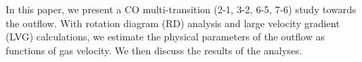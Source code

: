 In this paper, we present a CO multi-transition (2-1, 3-2, 6-5, 7-6) study towards the  outflow. With rotation diagram (RD) analysis and large velocity gradient (LVG) calculations, we estimate the physical parameters of the outflow as functions of gas velocity. We then discuss the results of the analyses.


